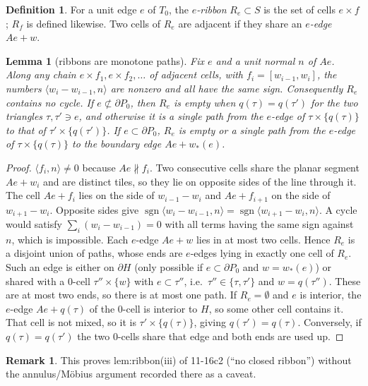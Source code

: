 \documentclass[11pt]{article}
\newtheorem{lemma}[theorem]{Lemma}
\theoremstyle{definition}
\newtheorem{definition}[theorem]{Definition}
\newtheorem{remark}[theorem]{Remark}
\begin{document}
\begin{definition}
For a unit edge $e$ of $T_0$, the \emph{$e$-ribbon} $R_e\subset S$ is the set of cells $e\times f$; $R_f$ is defined likewise. Two cells of $R_e$ are adjacent if they share an \emph{$e$-edge}
$Ae+w$.
\end{definition}

\begin{lemma}[ribbons are monotone paths]\label{lem:mono}
Fix $e$ and a unit normal $n$ of $Ae$. Along any chain $e\times f_1,e\times f_2,\dots$ of adjacent cells, with $f_i=[w_{i-1},w_i]$, the numbers
$\langle w_i-w_{i-1},n\rangle$ are nonzero and all have the same sign. Consequently $R_e$ contains no cycle. If $e\not\subset\partial P_0$, then $R_e$ is empty when
$q(\tau)=q(\tau')$ for the two triangles $\tau,\tau'\ni e$, and otherwise it is a single path from the $e$-edge of $\tau\times\{q(\tau)\}$ to that of $\tau'\times\{q(\tau')\}$. If
$e\subset\partial P_0$, $R_e$ is empty or a single path from the $e$-edge of $\tau\times\{q(\tau)\}$ to the boundary edge $Ae+w_*(e)$.
\end{lemma}
\begin{proof}
$\langle f_i,n\rangle\neq0$ because $Ae\nparallel f_i$. Two consecutive cells share the planar segment $Ae+w_i$ and are distinct tiles, so they lie on
opposite sides of the line through it. The cell $Ae+f_i$ lies on the side of $w_{i-1}-w_i$ and $Ae+f_{i+1}$ on the side of $w_{i+1}-w_i$. Opposite sides give
$\operatorname{sgn}\langle w_i-w_{i-1},n\rangle=\operatorname{sgn}\langle w_{i+1}-w_i,n\rangle$. A cycle would satisfy $\sum_i(w_i-w_{i-1})=0$
with all terms having the same sign against $n$, which is impossible. Each $e$-edge $Ae+w$ lies in at most two cells. Hence $R_e$ is a disjoint union of paths, whose ends are
$e$-edges lying in exactly one cell of $R_e$. Such an edge is either on $\partial H$ (only possible if $e\subset\partial P_0$ and $w=w_*(e)$) or shared with a
$0$-cell $\tau''\times\{w\}$ with $e\subset\tau''$, i.e.\ $\tau''\in\{\tau,\tau'\}$ and $w=q(\tau'')$. These are at most two ends, so there is at most one path.
If $R_e=\emptyset$ and $e$ is interior, the $e$-edge $Ae+q(\tau)$ of the $0$-cell is interior to $H$, so some other cell contains it. That cell is not mixed, so it is $\tau'\times\{q(\tau)\}$, giving
$q(\tau')=q(\tau)$. Conversely, if $q(\tau)=q(\tau')$ the two $0$-cells share that edge and both ends are used up.
\end{proof}
\begin{remark}This proves lem:ribbon(iii) of 11-16c2 (``no closed ribbon'') without the annulus/M\"obius argument recorded there as a caveat.\end{remark}
\end{document}
